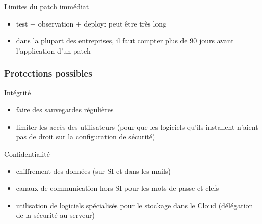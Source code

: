 \begin{reveals}
\begin{frame}
  \vfill

  \begin{block}{Limites du patch immédiat}
    \begin{itemize}
    \item test + observation + deploy: peut être très long
    \item dans la plupart des entreprises, il faut compter plus de 90
      jours avant l'application d'un patch
    \end{itemize}
  \end{block}

  \vfill


\end{frame}


\begin{frame}
  \frametitle{Protections possibles}

  \vfill

   \begin{block}{Intégrité}
     \begin{itemize}
     \item faire des sauvegardes régulières
     \item limiter les accès des utilisateurs (pour que les logiciels
       qu'ils installent n'aient pas de droit sur la configuration de
       sécurité)
     \end{itemize}
  \end{block}

  \vfill

  \begin{block}{Confidentialité}
    \begin{itemize}
    \item chiffrement des données (sur SI et dans les mails)
    \item canaux de communication hors SI pour les mots de passe et clefs
    \item utilisation de logiciels spécialisés pour le stockage dans le Cloud (délégation de la sécurité au serveur)
    \end{itemize}
  \end{block}

  \vfill



\end{frame}




  

\end{reveals}

 


